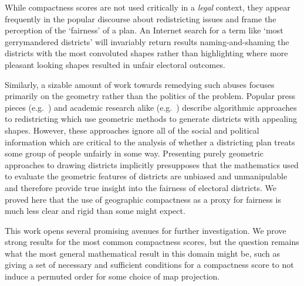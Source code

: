 While compactness scores are not used critically in a \textit{legal} context, they appear frequently in the popular discourse about redistricting issues and frame the perception of the \enquote*{fairness} of a plan.  An Internet search for a term like `most gerrymandered districts' will invariably return results naming-and-shaming the districts with the most convoluted shapes rather than highlighting where more pleasant looking shapes resulted in unfair electoral outcomes. 

Similarly, a sizable amount of work towards remedying such abuses focuses primarily on the geometry rather than the politics of the problem. Popular press pieces (e.g.\ \cite{ingraham2014solve}) and academic research alike (e.g.\ \cite{voronoi, svec2007applying, levin_friedler_2019}) describe algorithmic approaches to redistricting which use geometric methods to generate districts with appealing shapes.  
However, these approaches ignore all of the social and political information which are critical to the analysis of whether a districting plan treats some group of people unfairly in some way. 
Presenting purely geometric approaches to drawing districts implicitly presupposes that the mathematics used to evaluate the geometric features of districts are unbiased and unmanipulable and therefore provide true insight into the fairness of electoral districts.  We proved here that the use of geographic compactness as a proxy for fairness is much less clear and rigid than some might expect.




This work opens several promising avenues for further investigation.  We prove strong results for the most common compactness scores, but the question remains what the most general mathematical result in this domain might be, such as giving a set of necessary and sufficient conditions for a compactness score to not induce a permuted order for some choice of map projection.  